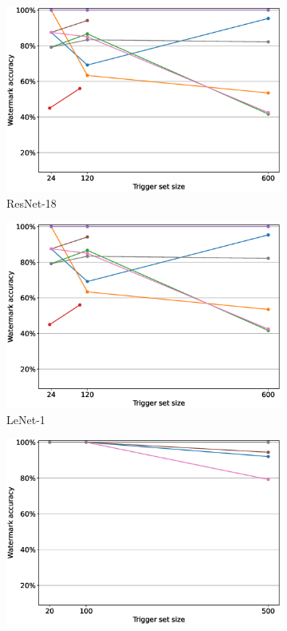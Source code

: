 \begin{figure}
\begin{subfigure}{0.4\linewidth}
        \includegraphics[width=\linewidth]{images/pruning/lenet1_pruning_per_arch_maximal_pr_rate.eps}
        \caption{ResNet-18}
        \label{fig:pruning-max-pr-rate-resnet18}
    \end{subfigure}
    \quad
    \begin{subfigure}{0.4\linewidth}
        \includegraphics[width=\linewidth]{images/pruning/lenet1_pruning_per_arch_maximal_pr_rate.eps}
        \caption{LeNet-1}
        \label{fig:pruning-max-pr-rate-lenet1}
    \end{subfigure}
    \quad
    \begin{subfigure}{0.4\linewidth}
        \includegraphics[width=\linewidth]{images/pruning/resnet34_pruning_per_arch_maximal_pr_rate.eps}

\end{subfigure}
\end{figure}
